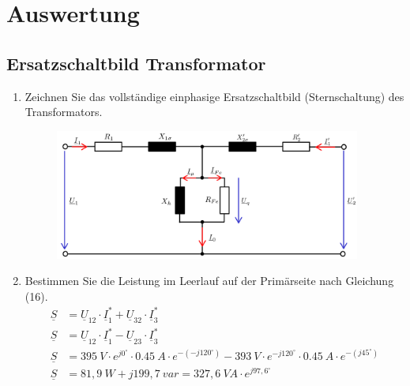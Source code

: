 \section{Auswertung}
\subsection{Ersatzschaltbild Transformator}
\begin{enumerate}[label=\alph*)]
	\item Zeichnen Sie das vollständige einphasige Ersatzschaltbild (Sternschaltung) des
	      Transformators.
	      \begin{figure}[h!]
		      \begin{center}
			      \includegraphics[width=0.95\textwidth]{img/4.1.1.1}
		      \end{center}
		      \caption{}\label{img:4.1.1.1}
	      \end{figure}

	\item Bestimmen Sie die Leistung im Leerlauf auf der Primärseite nach Gleichung (16).
	      \begin{align*}
		      \underline S & = \underline U_{12} \cdot \underline I_1^* + \underline U_{32}\cdot \underline I_3^*   \\
		      \underline S & = \underline U_{12} \cdot \underline I_1^* - \underline U_{23}\cdot \underline I_3^* \\
		      \underline S & = 395\ V \cdot e^{j0^\circ} \cdot 0.45\ A \cdot e^{-(-j120^\circ)} -
		      393\ V \cdot e^{-j120^\circ}\cdot 0.45\ A \cdot e^{-(j45^\circ)}                                   \\
		      \underline S & = 81,9\ W + j199,7\ var = 327,6\ VA\cdot e^{j97,6^\circ}
	      \end{align*}


\end{enumerate}
